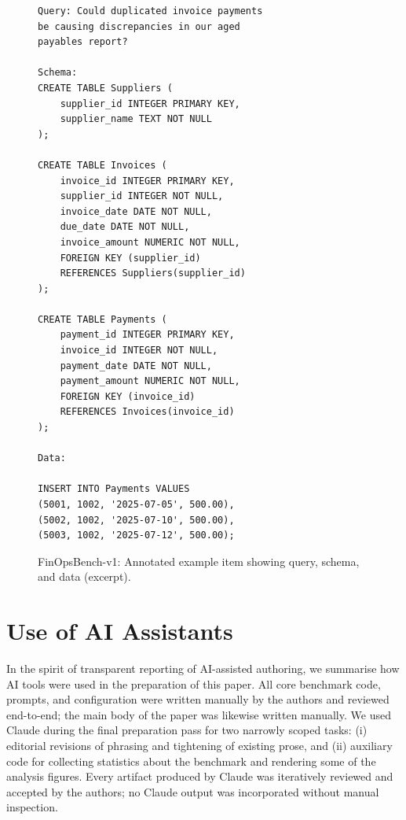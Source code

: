 \documentclass[11pt]{article}
\newcommand{\synthsubset}{FinOpsBench-v1}\xspace
\begin{document}
\begin{figure}[h]
\small\centering
\begin{verbatim}
Query: Could duplicated invoice payments 
be causing discrepancies in our aged 
payables report?

Schema:
CREATE TABLE Suppliers (
    supplier_id INTEGER PRIMARY KEY,
    supplier_name TEXT NOT NULL
);

CREATE TABLE Invoices (
    invoice_id INTEGER PRIMARY KEY,
    supplier_id INTEGER NOT NULL,
    invoice_date DATE NOT NULL,
    due_date DATE NOT NULL,
    invoice_amount NUMERIC NOT NULL,
    FOREIGN KEY (supplier_id) 
    REFERENCES Suppliers(supplier_id)
);

CREATE TABLE Payments (
    payment_id INTEGER PRIMARY KEY,
    invoice_id INTEGER NOT NULL,
    payment_date DATE NOT NULL,
    payment_amount NUMERIC NOT NULL,
    FOREIGN KEY (invoice_id) 
    REFERENCES Invoices(invoice_id)
);

Data:

INSERT INTO Payments VALUES
(5001, 1002, '2025-07-05', 500.00),
(5002, 1002, '2025-07-10', 500.00),
(5003, 1002, '2025-07-12', 500.00);

\end{verbatim}
\caption{\synthsubset: Annotated example item showing query, schema, and data (excerpt).}
\label{fig:example-item}
\end{figure}

\section{Use of AI Assistants}
\label{app:ai_usage}

In the spirit of transparent reporting of AI-assisted authoring, we summarise how AI tools were used in the preparation of this paper. All core benchmark code, prompts, and configuration were written manually by the authors and reviewed end-to-end; the main body of the paper was likewise written manually. We used Claude \citep{anthropic2024claude3} during the final preparation pass for two narrowly scoped tasks: (i) editorial revisions of phrasing and tightening of existing prose, and (ii) auxiliary code for collecting statistics about the benchmark and rendering some of the analysis figures. Every artifact produced by Claude was iteratively reviewed and accepted by the authors; no Claude output was incorporated without manual inspection.
\end{document}
